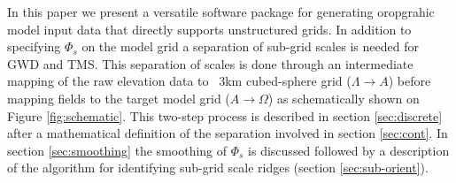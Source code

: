 \documentclass[gmd]{copernicus}
\begin{document}
%

In this paper we present a versatile software package for generating oropgrahic model input data that directly supports unstructured grids. In addition to specifying $\Phi_s$ on the model grid a separation of sub-grid scales is needed for GWD and TMS. This separation of scales is done through an intermediate mapping of the raw elevation data to ~3km cubed-sphere grid ($\Lambda \rightarrow A$) before mapping fields to the target model grid ($A \rightarrow \Omega$) as schematically shown on Figure \ref{fig:schematic}. This two-step process is described in section \ref{sec:discrete} after a mathematical definition of the separation involved in section \ref{sec:cont}. In section \ref{sec:smoothing} the smoothing of $\Phi_s$ is discussed followed by a description of the algorithm for identifying sub-grid scale ridges (section \ref{sec:sub-orient}).
\end{document}
